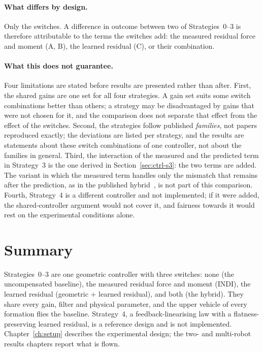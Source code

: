 \paragraph{What differs by design.} Only the switches. A difference in outcome between two of
Strategies~0--3 is therefore attributable to the terms the switches add: the measured residual force
and moment (A, B), the learned residual (C), or their combination.

\paragraph{What this does not guarantee.} Four limitations are stated before results are presented
rather than after. First, the shared gains are one set for all four strategies. A gain set suits
some switch combinations better than others; a strategy may be disadvantaged by gains that were not
chosen for it, and the comparison does not separate that effect from the effect of the switches.
Second, the strategies follow published \emph{families}, not papers reproduced exactly; the
deviations are listed per strategy, and the results are statements about these switch combinations
of one controller, not about the families in general. Third, the interaction of the measured and
the predicted term in Strategy~3 is the one derived in Section~\ref{sec:ctrl-s3}: the two terms are
added. The variant in which the measured term handles only the mismatch that remains after the
prediction, as in the published hybrid~\cite{cobobriesewitz2026lindi}, is not part of this
comparison.
Fourth, Strategy~4 is a different controller
and not implemented; if it were added, the shared-controller argument would not cover it, and
fairness towards it would rest on the experimental conditions alone.

\section{Summary}
\label{sec:ctrl-summary}

Strategies~0--3 are one geometric controller with three switches: none (the uncompensated
baseline), the measured residual force and moment (INDI), the learned residual (geometric + learned
residual), and both (the hybrid). They share every gain, filter and physical parameter, and the
upper vehicle of every formation flies the baseline. Strategy~4, a feedback-linearising law with a
flatness-preserving learned residual, is a reference design and is not implemented.
Chapter~\ref{ch:setup} describes the experimental design; the two- and multi-robot results chapters
report what is flown.
